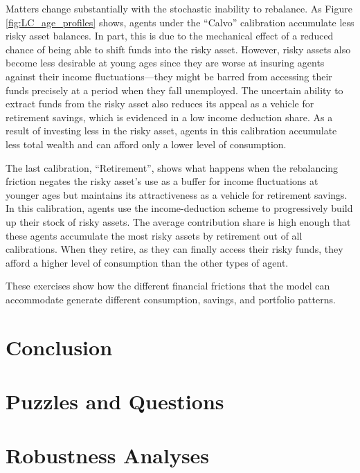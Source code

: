 \documentclass[./RiskyContrib.tex]{subfiles}
\begin{document}
Matters change substantially with the stochastic inability to rebalance. As Figure
\ref{fig:LC_age_profiles} shows, agents under the ``Calvo'' calibration accumulate
less risky asset balances. In part, this is due to the mechanical effect of a reduced
chance of being able to shift funds into the risky asset. However, risky assets also
become less desirable at young ages since they are worse at insuring agents against
their income fluctuations---they might be barred from accessing their funds precisely
at a period when they fall unemployed. The uncertain ability to extract funds from the
risky asset also reduces its appeal as a vehicle for retirement savings, which is
evidenced in a low income deduction share. As a result of investing less in the risky
asset, agents in this calibration accumulate less total wealth and can afford only a
lower level of consumption.

The last calibration, ``Retirement'', shows what happens when the rebalancing friction
negates the risky asset's use as a buffer for income fluctuations at younger ages but
maintains its attractiveness as a vehicle for retirement savings. In this calibration,
agents use the income-deduction scheme to progressively build up their stock of risky
assets. The average contribution share is high enough that these agents accumulate the
most risky assets by retirement out of all calibrations. When they retire, as they can
finally access their risky funds, they afford a higher level of consumption than the
other types of agent.

These exercises show how the different financial frictions that the model can
accommodate generate different consumption, savings, and portfolio patterns.


\hypertarget{Conclusion}{}
\section{Conclusion}

\hypertarget{Puzzles-and-Questions}{}
\section{Puzzles and Questions}\label{sec:Puzzles}

\hypertarget{Robustness Analyses}{}
\section{Robustness Analyses}

\clearpage\vfill\eject

\onlyinsubfile{}
\end{document}
